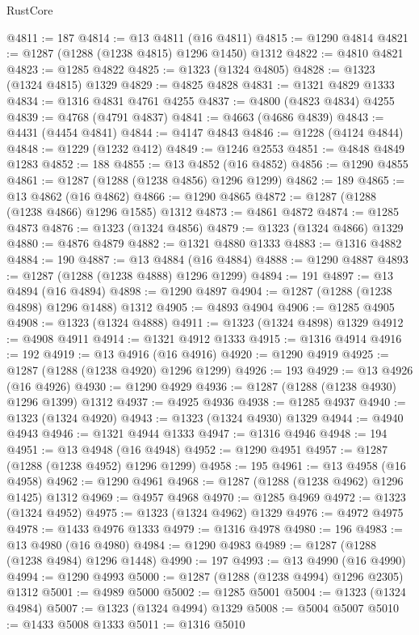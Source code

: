 \begin{lexlean}{RustCore}
\begin{coremodule}
@4811 := 187
@4814 := @13 @4811 (@16 @4811)
@4815 := @1290 @4814
@4821 := @1287 (@1288 (@1238 @4815) @1296 @1450) @1312
@4822 := @4810 @4821
@4823 := @1285 @4822
@4825 := @1323 (@1324 @4805)
@4828 := @1323 (@1324 @4815) @1329
@4829 := @4825 @4828
@4831 := @1321 @4829 @1333
@4834 := @1316 @4831 @4761 @4255
@4837 := @4800 (@4823 @4834) @4255
@4839 := @4768 (@4791 @4837)
@4841 := @4663 (@4686 @4839)
@4843 := @4431 (@4454 @4841)
@4844 := @4147 @4843
@4846 := @1228 (@4124 @4844)
@4848 := @1229 (@1232 @412)
@4849 := @1246 @2553
@4851 := @4848 @4849 @1283
@4852 := 188
@4855 := @13 @4852 (@16 @4852)
@4856 := @1290 @4855
@4861 := @1287 (@1288 (@1238 @4856) @1296 @1299)
@4862 := 189
@4865 := @13 @4862 (@16 @4862)
@4866 := @1290 @4865
@4872 := @1287 (@1288 (@1238 @4866) @1296 @1585) @1312
@4873 := @4861 @4872
@4874 := @1285 @4873
@4876 := @1323 (@1324 @4856)
@4879 := @1323 (@1324 @4866) @1329
@4880 := @4876 @4879
@4882 := @1321 @4880 @1333
@4883 := @1316 @4882
@4884 := 190
@4887 := @13 @4884 (@16 @4884)
@4888 := @1290 @4887
@4893 := @1287 (@1288 (@1238 @4888) @1296 @1299)
@4894 := 191
@4897 := @13 @4894 (@16 @4894)
@4898 := @1290 @4897
@4904 := @1287 (@1288 (@1238 @4898) @1296 @1488) @1312
@4905 := @4893 @4904
@4906 := @1285 @4905
@4908 := @1323 (@1324 @4888)
@4911 := @1323 (@1324 @4898) @1329
@4912 := @4908 @4911
@4914 := @1321 @4912 @1333
@4915 := @1316 @4914
@4916 := 192
@4919 := @13 @4916 (@16 @4916)
@4920 := @1290 @4919
@4925 := @1287 (@1288 (@1238 @4920) @1296 @1299)
@4926 := 193
@4929 := @13 @4926 (@16 @4926)
@4930 := @1290 @4929
@4936 := @1287 (@1288 (@1238 @4930) @1296 @1399) @1312
@4937 := @4925 @4936
@4938 := @1285 @4937
@4940 := @1323 (@1324 @4920)
@4943 := @1323 (@1324 @4930) @1329
@4944 := @4940 @4943
@4946 := @1321 @4944 @1333
@4947 := @1316 @4946
@4948 := 194
@4951 := @13 @4948 (@16 @4948)
@4952 := @1290 @4951
@4957 := @1287 (@1288 (@1238 @4952) @1296 @1299)
@4958 := 195
@4961 := @13 @4958 (@16 @4958)
@4962 := @1290 @4961
@4968 := @1287 (@1288 (@1238 @4962) @1296 @1425) @1312
@4969 := @4957 @4968
@4970 := @1285 @4969
@4972 := @1323 (@1324 @4952)
@4975 := @1323 (@1324 @4962) @1329
@4976 := @4972 @4975
@4978 := @1433 @4976 @1333
@4979 := @1316 @4978
@4980 := 196
@4983 := @13 @4980 (@16 @4980)
@4984 := @1290 @4983
@4989 := @1287 (@1288 (@1238 @4984) @1296 @1448)
@4990 := 197
@4993 := @13 @4990 (@16 @4990)
@4994 := @1290 @4993
@5000 := @1287 (@1288 (@1238 @4994) @1296 @2305) @1312
@5001 := @4989 @5000
@5002 := @1285 @5001
@5004 := @1323 (@1324 @4984)
@5007 := @1323 (@1324 @4994) @1329
@5008 := @5004 @5007
@5010 := @1433 @5008 @1333
@5011 := @1316 @5010

\end{coremodule}
\end{lexlean}
